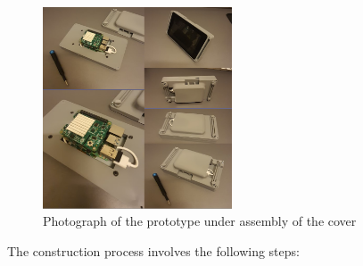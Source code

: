 \documentclass[../main.tex]{subfiles}
\begin{document}
    \begin{figure}[htbp]
        \centering
        \includegraphics[width=0.5\textwidth]
        {resources/images/prorotype-under-assembly.png}
        \caption{Photograph of the prototype under assembly of the cover}
        \label{fig:prorotype-under-assembly}
    \end{figure}

    The construction process involves the following steps:
\end{document}
